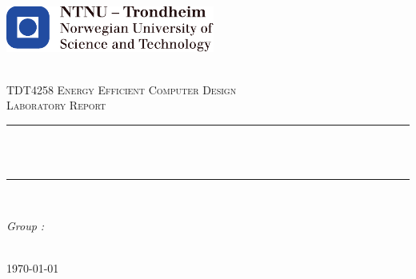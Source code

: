 \begin{titlepage}
\includegraphics[height=1.5cm]{images/ntnu_logo.pdf}\\[1cm]
\begin{center}

~\\[1.5cm]

\textsc{\Large TDT4258 Energy Efficient Computer Design\\Laboratory Report}\\[0.5cm]

\hrule ~\\[0.2cm]
{\huge \bfseries \mytitle}\\[0.4cm]		%
\hrule ~\\[1.5cm]

\begin{minipage}{0.4\textwidth}
    \centering
	\large
		\emph{Group \mygroupnumber:}\\~\\
		\myauthor
\end{minipage}

\vfill

{\large \today}

\end{center}
\end{titlepage}

